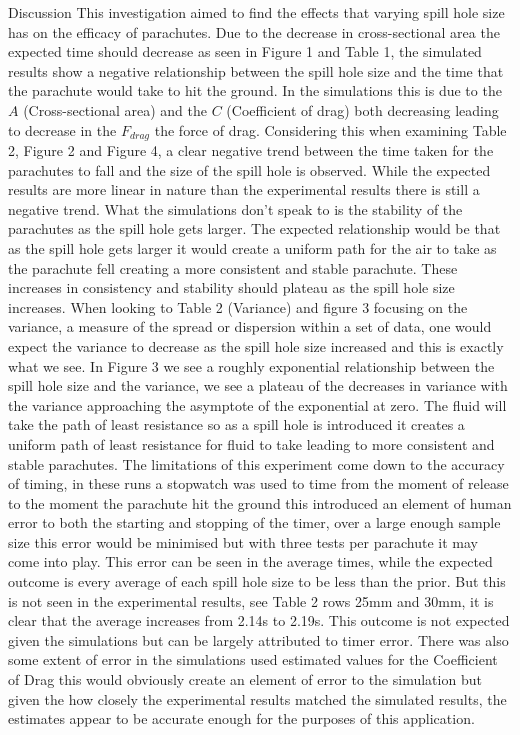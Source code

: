\documentclass[final]{beamer}
\newlength{\colwidth}
\begin{document}
\begin{frame}[t]
\begin{columns}[t]
\begin{column}{\colwidth}
\begin{block}{Discussion}
This investigation aimed to find the effects that varying spill hole size has on the efficacy of parachutes. Due to the decrease in cross-sectional area the expected time should decrease as seen in Figure 1 and Table 1, the simulated results show a negative relationship between the spill hole size and the time that the parachute would take to hit the ground. In the simulations this is due to the $A$ (Cross-sectional area) and the $C$ (Coefficient of drag) both decreasing leading to decrease in the $F_{drag}$ the force of drag. Considering this when examining Table 2, Figure 2 and Figure 4, a clear negative trend between the time taken for the parachutes to fall and the size of the spill hole is observed. While the expected results are more linear in nature than the experimental results there is still a negative trend. What the simulations don't speak to is the stability of the parachutes as the spill hole gets larger. The expected relationship would be that as the spill hole gets larger it would create a uniform path for the air to take as the parachute fell creating a more consistent and stable parachute. These increases in consistency and stability should plateau as the spill hole size increases. When looking to Table 2 (Variance) and figure 3 focusing on the variance, a measure of the spread or dispersion within a set of data, one would expect the variance to decrease as the spill hole size increased and this is exactly what we see. In Figure 3 we see a roughly exponential relationship between the spill hole size and the variance, we see a plateau of the decreases in variance with the variance approaching the asymptote of the exponential at zero. The fluid will take the path of least resistance so as a spill hole is introduced it creates a uniform path of least resistance for fluid to take leading to more consistent and stable parachutes. The limitations of this experiment come down to the accuracy of timing, in these runs a stopwatch was used to time from the moment of release to the moment the parachute hit the ground this introduced an element of human error to both the starting and stopping of the timer, over a large enough sample size this error would be minimised but with three tests per parachute it may come into play. This error can be seen in the average times, while the expected outcome is every average of each spill hole size to be less than the prior. But this is not seen in the experimental results, see Table 2 rows 25mm and 30mm, it is clear that the average increases from 2.14s to 2.19s. This outcome is not expected given the simulations but can be largely attributed to timer error. There was also some extent of error in the simulations used estimated values for the Coefficient of Drag this would obviously create an element of error to the simulation but given the how closely the experimental results matched the simulated results, the estimates appear to be  accurate enough for the purposes of this application. 
 \end{block}


\end{column}
\end{columns}
\end{frame}
\end{document}
